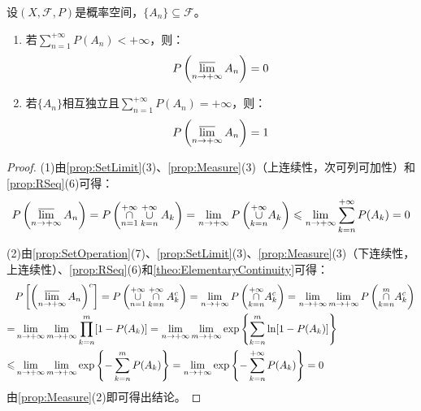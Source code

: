 \begin{lemma}\label{lem:BorelCantelli}
	设$(X,\mathscr{F},P)$是概率空间，$\{A_n\}\subseteq\mathscr{F}$。
	\begin{enumerate}
		\item 若$\sum\limits_{n=1}^{+\infty}P(A_n)<+\infty$，则：
		\begin{equation*}
			P\left(\varlimsup_{n\to+\infty}A_n\right)=0
		\end{equation*}
		\item 若$\{A_n\}$相互独立且$\sum\limits_{n=1}^{+\infty}P(A_n)=+\infty$，则：
		\begin{equation*}
			P\left(\varlimsup_{n\to+\infty}A_n\right)=1
		\end{equation*}
	\end{enumerate}
\end{lemma}
\begin{proof}
	(1)由\cref{prop:SetLimit}(3)、\cref{prop:Measure}(3)（上连续性，次可列可加性）和\cref{prop:RSeq}(6)可得：
	\begin{equation*}
		P\left(\varlimsup_{n\to+\infty}A_n\right)=P\left(\underset{n=1}{\overset{+\infty}{\cap}}\underset{k=n}{\overset{+\infty}{\cup}}A_k\right)=\lim_{n\to+\infty}P\left(\underset{k=n}{\overset{+\infty}{\cup}}A_k\right)\leqslant\lim_{n\to+\infty}\sum_{k=n}^{+\infty}P(A_k)=0
	\end{equation*}\par
	(2)由\cref{prop:SetOperation}(7)、\cref{prop:SetLimit}(3)、\cref{prop:Measure}(3)（下连续性，上连续性）、\cref{prop:RSeq}(6)和\cref{theo:ElementaryContinuity}可得：
	\begin{align*}
		&P\left[\left(\varlimsup_{n\to+\infty}A_n\right)^c\right]=P\left(\underset{n=1}{\overset{+\infty}{\cup}}\underset{k=n}{\overset{+\infty}{\cap}}A_k^c\right)=\lim_{n\to+\infty}P\left(\underset{k=n}{\overset{+\infty}{\cap}}A_k^c\right)=\lim_{n\to+\infty}\lim_{m\to+\infty}P\left(\underset{k=n}{\overset{m}{\cap}}A_k^c\right) \\
		=&\lim_{n\to+\infty}\lim_{m\to+\infty}\prod_{k=n}^{m}[1-P(A_k)]=\lim_{n\to+\infty}\lim_{m\to+\infty}\exp\left\{\sum_{k=n}^{m}\ln[1-P(A_k)]\right\} \\
		\leqslant&\lim_{n\to+\infty}\lim_{m\to+\infty}\exp\left\{-\sum_{k=n}^{m}P(A_k)\right\}=\lim_{n\to+\infty}\exp\left\{-\sum_{k=n}^{+\infty}P(A_k)\right\}=0
	\end{align*}
	由\cref{prop:Measure}(2)即可得出结论。
\end{proof}

